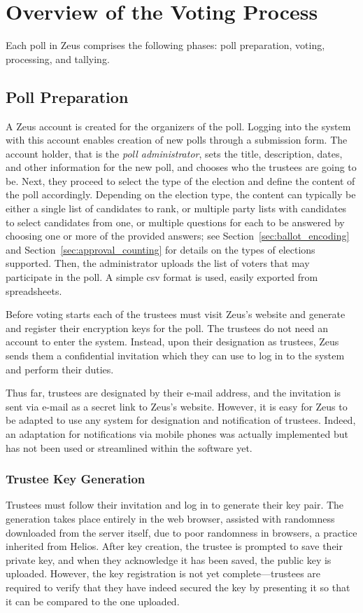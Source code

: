 \documentclass[letterpaper,10pt]{article}
\begin{document}
\section{Overview of the Voting Process}
\label{sec:voting_overview}

Each poll in Zeus comprises the following phases:
poll preparation, voting, processing, and tallying.

\subsection{Poll Preparation}
A Zeus account is created for the organizers of the poll.
Logging into the system with this account enables creation of new polls
through a submission form.
The account holder, that is the \emph{poll administrator},
sets the title, description, dates, and other information for the new
poll, and chooses who the trustees are going to be.
Next, they proceed to select the type of the election and define the
content of the poll accordingly.
Depending on the election type,
the content can typically be either a single list of candidates to rank,
or multiple party lists with candidates to select candidates from one,
or multiple questions for each to be answered by choosing one or more of
the provided answers; see Section~\ref{sec:ballot_encoding} 
and Section~\ref{sec:approval_counting} for details on the types of elections 
supported. Then, the administrator uploads the list of voters that may 
participate in the poll. A simple {\sc csv} format is used, easily 
exported from spreadsheets.

Before voting starts each of the trustees must visit Zeus's website
and generate and register their encryption keys for the poll.
The trustees do not need an account to enter the system.
Instead, upon their designation as trustees, Zeus sends them a
confidential invitation which they can use to log in to the system
and perform their duties.

Thus far, trustees are designated by their e-mail address, and the
invitation is sent via e-mail as a secret link to Zeus's website.
However, it is easy for Zeus to be adapted to use any system for
designation and notification of trustees. Indeed, an adaptation 
for notifications via mobile phones was actually implemented but
has not been used or streamlined within the software yet.

\subsubsection{Trustee Key Generation}
Trustees must follow their invitation and log in to generate their
key pair. The generation takes place entirely in the web browser,
assisted with randomness downloaded from the server itself, 
due to poor randomness in browsers, a practice inherited from Helios.
After key creation, the trustee is prompted to save their private key,
and when they acknowledge it has been saved, the public key is uploaded.
However, the key registration is not yet complete---trustees are
required to verify that they have indeed secured the key by
presenting it so that it can be compared to the one uploaded.
\end{document}
